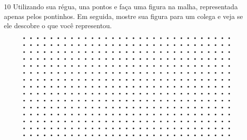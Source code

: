 \num{10} Utilizando sua régua, una pontos e faça uma figura na malha, representada apenas pelos pontinhos. Em seguida, mostre sua
figura para um colega e veja se ele descobre o que você representou.

\begin{figure}[htpb!]
\includegraphics[width=\textwidth]{./media/image58.png}
\end{figure}

